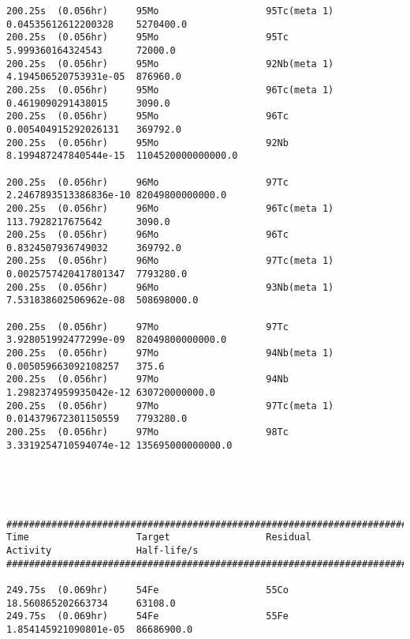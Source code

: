 \begin{lstlisting}[style=sOutputFile,caption={Final results for steel irradiation},label={listing:alexsteel}]
200.25s  (0.056hr)     95Mo                   95Tc(meta 1)           0.04535612612200328    5270400.0             
200.25s  (0.056hr)     95Mo                   95Tc                   5.999360164324543      72000.0               
200.25s  (0.056hr)     95Mo                   92Nb(meta 1)           4.194506520753931e-05  876960.0              
200.25s  (0.056hr)     95Mo                   96Tc(meta 1)           0.4619090291438015     3090.0                
200.25s  (0.056hr)     95Mo                   96Tc                   0.005404915292026131   369792.0              
200.25s  (0.056hr)     95Mo                   92Nb                   8.199487247840544e-15  1104520000000000.0    

200.25s  (0.056hr)     96Mo                   97Tc                   2.2467893513386836e-10 82049800000000.0      
200.25s  (0.056hr)     96Mo                   96Tc(meta 1)           113.7928217675642      3090.0                
200.25s  (0.056hr)     96Mo                   96Tc                   0.8324507936749032     369792.0              
200.25s  (0.056hr)     96Mo                   97Tc(meta 1)           0.0025757420417801347  7793280.0             
200.25s  (0.056hr)     96Mo                   93Nb(meta 1)           7.531838602506962e-08  508698000.0           

200.25s  (0.056hr)     97Mo                   97Tc                   3.928051992477299e-09  82049800000000.0      
200.25s  (0.056hr)     97Mo                   94Nb(meta 1)           0.005059663092108257   375.6                 
200.25s  (0.056hr)     97Mo                   94Nb                   1.2982374959935042e-12 630720000000.0        
200.25s  (0.056hr)     97Mo                   97Tc(meta 1)           0.014379672301150559   7793280.0             
200.25s  (0.056hr)     97Mo                   98Tc                   3.3319254710594074e-12 135695000000000.0     





####################################################################################################################
Time                   Target                 Residual               Activity               Half-life/s            
####################################################################################################################

249.75s  (0.069hr)     54Fe                   55Co                   18.560865202663734     63108.0               
249.75s  (0.069hr)     54Fe                   55Fe                   1.854145921090801e-05  86686900.0            


\end{lstlisting}
